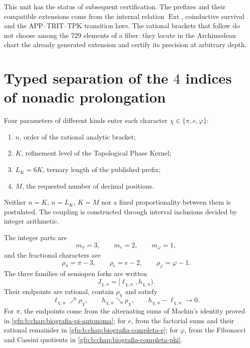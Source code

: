 
\label{gfp:b:chap:precision-arbitraria-constantes}

This unit has the status of subsequent certification. The prefixes and their
compatible extensions come from the internal relation
\(\operatorname{Ext}\), coinductive survival and the APP--TRIT--TPK
transition laws. The rational brackets that follow do not choose
among the \(729\) elements of a fiber: they locate in the Archimedean chart
the already generated extension and certify its precision at arbitrary depth.

\section{Typed separation of the \(4\) indices of nonadic prolongation}

Four parameters of different kinds enter each character \(\chi\in\{\pi,e,\varphi\}\):
\begin{enumerate}
 \item \(n\), order of the rational analytic bracket;
 \item \(K\), refinement level of the Topological Phase Kernel;
 \item \(L_K=6K\), ternary length of the published prefix;
 \item \(M\), the requested number of decimal positions.
\end{enumerate}
Neither \(n=K\), \(n=L_K\), \(K=M\) nor a fixed proportionality
between them is postulated. The coupling is constructed through interval inclusions
decided by integer arithmetic.

The integer parts are
\[
 m_\pi=3,
 \qquad
 m_e=2,
 \qquad
 m_\varphi=1,
\]
and the fractional characters are
\[
 \rho_\pi=\pi-3,
 \qquad
 \rho_e=e-2,
 \qquad
 \rho_\varphi=\varphi-1.
\]
The three families of semiopen forks are written
\[
 J_{\chi,n}=[\ell_{\chi,n},h_{\chi,n}).
\]
Their endpoints are rational, contain \(\rho_\chi\) and satisfy
\[
 \ell_{\chi,n}\nearrow\rho_\chi,
 \qquad
 h_{\chi,n}\searrow\rho_\chi,
 \qquad
 h_{\chi,n}-\ell_{\chi,n}\longrightarrow0.
\]
For \(\pi\), the endpoints come from the alternating sums of Machin’s
identity proved in \cref{gfp:b:chap:biografia-pi-autonoma}; for \(e\),
from the factorial sums and their rational remainder in
\cref{gfp:b:chap:biografia-completa-e}; for \(\varphi\), from the Fibonacci
and Cassini quotients in \cref{gfp:b:chap:biografia-completa-phi}.

